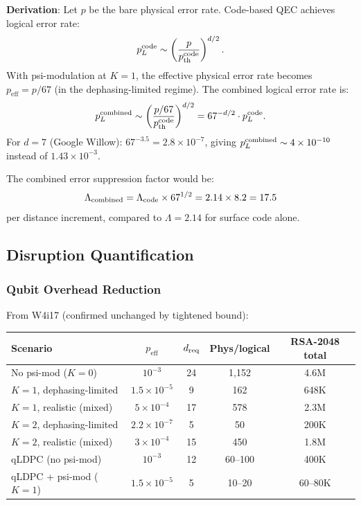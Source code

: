 \documentclass[11pt]{article}
\theoremstyle{definition}
\theoremstyle{remark}
\newcommand{\ee}[1]{\times 10^{#1}}
\newcommand{\pth}{p_{\mathrm{th}}}
\newcommand{\peff}{p_{\mathrm{eff}}}
\newcommand{\pL}{p_L}
\begin{document}
\textbf{Derivation}: Let $p$ be the bare physical error rate.
Code-based QEC achieves logical error rate:
\begin{equation}
\pL^{\rm code} \sim \left(\frac{p}{\pth^{\rm code}}\right)^{d/2}.
\end{equation}
With psi-modulation at $K=1$, the effective physical error rate
becomes $\peff = p/67$ (in the dephasing-limited regime). The
combined logical error rate is:
\begin{equation}
\pL^{\rm combined} \sim \left(\frac{p/67}{\pth^{\rm code}}\right)^{d/2}
= 67^{-d/2} \cdot \pL^{\rm code}.
\end{equation}
For $d = 7$ (Google Willow): $67^{-3.5} = 2.8\ee{-7}$, giving
$\pL^{\rm combined} \sim 4\ee{-10}$ instead of $1.43\ee{-3}$.

The combined error suppression factor would be:
\begin{equation}
\Lambda_{\rm combined} = \Lambda_{\rm code} \times 67^{1/2} = 2.14 \times 8.2 = 17.5
\end{equation}
per distance increment, compared to $\Lambda = 2.14$ for surface code alone.

\subsection{Disruption Quantification}

\subsubsection{Qubit Overhead Reduction}

From W4i17 (confirmed unchanged by tightened bound):

\begin{center}
\begin{tabular}{@{}lcccc@{}}
\toprule
\textbf{Scenario} & $\peff$ & $d_{\rm req}$ &
  \textbf{Phys/logical} & \textbf{RSA-2048 total} \\
\midrule
No psi-mod ($K=0$) & $10^{-3}$ & 24 & 1{,}152 & 4.6M \\
$K=1$, dephasing-limited & $1.5\ee{-5}$ & 9 & 162 & 648K \\
$K=1$, realistic (mixed) & $5\ee{-4}$ & 17 & 578 & 2.3M \\
$K=2$, dephasing-limited & $2.2\ee{-7}$ & 5 & 50 & 200K \\
$K=2$, realistic (mixed) & $3\ee{-4}$ & 15 & 450 & 1.8M \\
qLDPC (no psi-mod) & $10^{-3}$ & 12 & 60--100 & 400K \\
qLDPC + psi-mod ($K=1$) & $1.5\ee{-5}$ & 5 & 10--20 & 60--80K \\
\bottomrule
\end{tabular}
\end{center}
\end{document}
